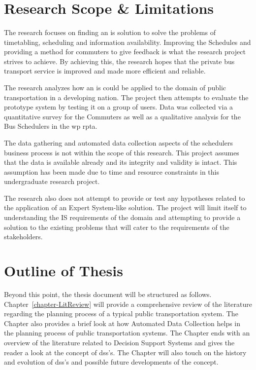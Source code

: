 \section{Research Scope \& Limitations}
\label{section-ResearchScope}

\paragraph{ } The research focuses on finding an \acrshort{is} solution to solve the problems of timetabling, scheduling and information availability. Improving the Schedules and providing a method for commuters to give feedback is what the research project strives to achieve. By achieving this, the research hopes that the private bus transport service is improved and made more efficient and reliable.

The research analyzes how an \acrshort{is} could be applied to the domain of public transportation in a developing nation. The project then attempts to evaluate the prototype system by testing it on a group of users. Data was collected via a quantitative survey for the Commuters as well as a qualitative analysis for the Bus Schedulers in the \acrshort{wp} \acrshort{rpta}.

The data gathering and automated data collection aspects of the schedulers business process is not within the scope of this research. This project assumes that the data is available already and its integrity and validity is intact. This assumption has been made due to time and resource constraints in this undergraduate research project.

The research also does not attempt to provide or test any hypotheses related to the application of an Expert System-like solution. The project will limit itself to understanding the IS requirements of the domain and attempting to provide a solution to the existing problems that will cater to the requirements of the stakeholders.



\section{Outline of Thesis}
\label{section-OutlineOfThesis}

Beyond this point, the thesis document will be structured as follows. Chapter~\ref{chapter-LitReview} will provide a comprehensive review of the literature regarding the planning process of a typical public transportation system. The Chapter also provides a brief look at how Automated Data Collection helps in the planning process of public transportation systems. The Chapter ends with an overview of the literature related to Decision Support Systems and gives the reader a look at the concept of \acrshort{dss}'s. The Chapter will also touch on the history and evolution of \acrshort{dss}'s and possible future developments of the concept.

